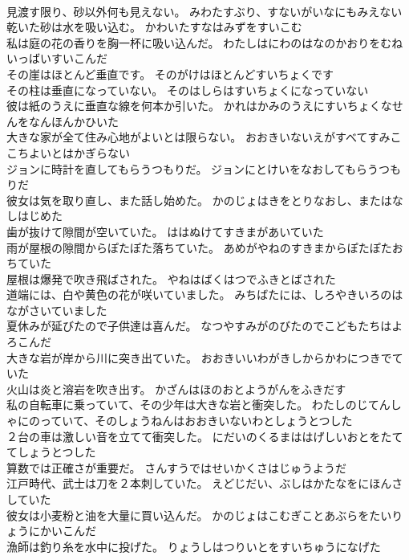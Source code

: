 \documentclass[8pt]{extreport}
\begin{document}
\begin{CJK}{UTF8}{min}
\\	見渡す限り、砂以外何も見えない。	みわたすぶり、すないがいなにもみえない 
\\	乾いた砂は水を吸い込む。	かわいたすなはみずをすいこむ 
\\	私は庭の花の香りを胸一杯に吸い込んだ。	わたしはにわのはなのかおりをむねいっばいすいこんだ 
\\	その崖はほとんど垂直です。	そのがけはほとんどすいちょくです 
\\	その柱は垂直になっていない。	そのはしらはすいちょくになっていない 
\\	彼は紙のうえに垂直な線を何本か引いた。	かれはかみのうえにすいちょくなせんをなんほんかひいた 
\\	大きな家が全て住み心地がよいとは限らない。	おおきいないえがすべてすみここちよいとはかぎらない 
\\	ジョンに時計を直してもらうつもりだ。	ジョンにとけいをなおしてもらうつもりだ 
\\	彼女は気を取り直し、また話し始めた。	かのじょはきをとりなおし、またはなしはじめた 
\\	歯が抜けて隙間が空いていた。	ははぬけてすきまがあいていた 
\\	雨が屋根の隙間からぽたぽた落ちていた。	あめがやねのすきまからぽたぽたおちていた 
\\	屋根は爆発で吹き飛ばされた。	やねはばくはつでふきとばされた 
\\	道端には、白や黄色の花が咲いていました。	みちばたには、しろやきいろのはながさいていました 
\\	夏休みが延びたので子供達は喜んだ。	なつやすみがのびたのでこどもたちはよろこんだ 
\\	大きな岩が岸から川に突き出ていた。	おおきいいわがきしからかわにつきでていた 
\\	火山は炎と溶岩を吹き出す。	かざんはほのおとようがんをふきだす 
\\	私の自転車に乗っていて、その少年は大きな岩と衝突した。	わたしのじてんしゃにのっていて、そのしょうねんはおおきいないわとしょうとつした 
\\	２台の車は激しい音を立てて衝突した。	にだいのくるまははげしいおとをたててしょうとつした 
\\	算数では正確さが重要だ。	さんすうではせいかくさはじゅうようだ 
\\	江戸時代、武士は刀を２本刺していた。	えどじだい、ぶしはかたなをにほんさしていた 
\\	彼女は小麦粉と油を大量に買い込んだ。	かのじょはこむぎことあぶらをたいりょうにかいこんだ 
\\	漁師は釣り糸を水中に投げた。	りょうしはつりいとをすいちゅうになげた 

\end{CJK}
\end{document}
